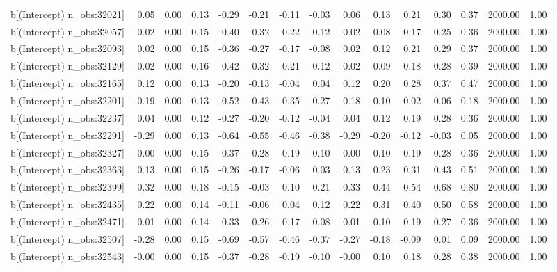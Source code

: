 \begin{table}[ht]
\begin{tabular}{rrrrrrrrrrrrrrr}
  b[(Intercept) n\_obs:32021] & 0.05 & 0.00 & 0.13 & -0.29 & -0.21 & -0.11 & -0.03 & 0.06 & 0.13 & 0.21 & 0.30 & 0.37 & 2000.00 & 1.00 \\ 
  b[(Intercept) n\_obs:32057] & -0.02 & 0.00 & 0.15 & -0.40 & -0.32 & -0.22 & -0.12 & -0.02 & 0.08 & 0.17 & 0.25 & 0.36 & 2000.00 & 1.00 \\ 
  b[(Intercept) n\_obs:32093] & 0.02 & 0.00 & 0.15 & -0.36 & -0.27 & -0.17 & -0.08 & 0.02 & 0.12 & 0.21 & 0.29 & 0.37 & 2000.00 & 1.00 \\ 
  b[(Intercept) n\_obs:32129] & -0.02 & 0.00 & 0.16 & -0.42 & -0.32 & -0.21 & -0.12 & -0.02 & 0.09 & 0.18 & 0.28 & 0.39 & 2000.00 & 1.00 \\ 
  b[(Intercept) n\_obs:32165] & 0.12 & 0.00 & 0.13 & -0.20 & -0.13 & -0.04 & 0.04 & 0.12 & 0.20 & 0.28 & 0.37 & 0.47 & 2000.00 & 1.00 \\ 
  b[(Intercept) n\_obs:32201] & -0.19 & 0.00 & 0.13 & -0.52 & -0.43 & -0.35 & -0.27 & -0.18 & -0.10 & -0.02 & 0.06 & 0.18 & 2000.00 & 1.00 \\ 
  b[(Intercept) n\_obs:32237] & 0.04 & 0.00 & 0.12 & -0.27 & -0.20 & -0.12 & -0.04 & 0.04 & 0.12 & 0.19 & 0.28 & 0.36 & 2000.00 & 1.00 \\ 
  b[(Intercept) n\_obs:32291] & -0.29 & 0.00 & 0.13 & -0.64 & -0.55 & -0.46 & -0.38 & -0.29 & -0.20 & -0.12 & -0.03 & 0.05 & 2000.00 & 1.00 \\ 
  b[(Intercept) n\_obs:32327] & 0.00 & 0.00 & 0.15 & -0.37 & -0.28 & -0.19 & -0.10 & 0.00 & 0.10 & 0.19 & 0.28 & 0.36 & 2000.00 & 1.00 \\ 
  b[(Intercept) n\_obs:32363] & 0.13 & 0.00 & 0.15 & -0.26 & -0.17 & -0.06 & 0.03 & 0.13 & 0.23 & 0.31 & 0.43 & 0.51 & 2000.00 & 1.00 \\ 
  b[(Intercept) n\_obs:32399] & 0.32 & 0.00 & 0.18 & -0.15 & -0.03 & 0.10 & 0.21 & 0.33 & 0.44 & 0.54 & 0.68 & 0.80 & 2000.00 & 1.00 \\ 
  b[(Intercept) n\_obs:32435] & 0.22 & 0.00 & 0.14 & -0.11 & -0.06 & 0.04 & 0.12 & 0.22 & 0.31 & 0.40 & 0.50 & 0.58 & 2000.00 & 1.00 \\ 
  b[(Intercept) n\_obs:32471] & 0.01 & 0.00 & 0.14 & -0.33 & -0.26 & -0.17 & -0.08 & 0.01 & 0.10 & 0.19 & 0.27 & 0.36 & 2000.00 & 1.00 \\ 
  b[(Intercept) n\_obs:32507] & -0.28 & 0.00 & 0.15 & -0.69 & -0.57 & -0.46 & -0.37 & -0.27 & -0.18 & -0.09 & 0.01 & 0.09 & 2000.00 & 1.00 \\ 
  b[(Intercept) n\_obs:32543] & -0.00 & 0.00 & 0.15 & -0.37 & -0.28 & -0.19 & -0.10 & -0.00 & 0.10 & 0.18 & 0.28 & 0.38 & 2000.00 & 1.00 \\ 

\end{tabular}
\end{table}
